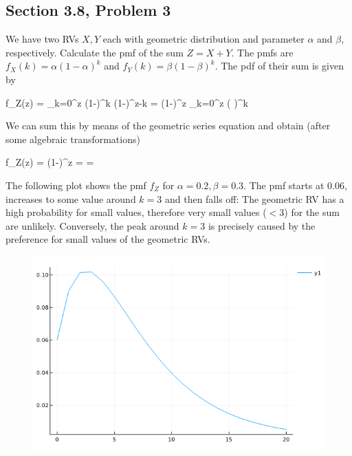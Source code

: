 
\subsection{Section 3.8, Problem 3}

We have two RVs $X, Y$ each with geometric distribution and parameter $\alpha$ and $\beta$, respectively. Calculate the pmf of the sum $Z = X+Y$. The pmfs are $f_X(k) = \alpha(1-\alpha)^k$ and $f_Y(k) = \beta(1-\beta)^k$. The pdf of their sum is given by

\bee
f_Z(z) = \sum_{k=0}^z \alpha (1-\alpha)^k \beta (1-\beta)^{z-k} = \alpha \beta (1-\beta)^z \sum_{k=0}^z \left( \right)^k
\eee

We can sum this by means of the geometric series equation and obtain (after some algebraic transformations)

\bee
f_Z(z) = \alpha \beta (1-\beta)^z  = \cdots = \frac{\alpha \beta}{\alpha-\beta} 
\eee

The following plot shows the pmf $f_Z$ for $\alpha=0.2, \beta=0.3$. The pmf starts at $0.06$, increases to some value around $k=3$ and then falls off: The geometric RV has a high probability for small values, therefore very small values ($< 3$) for the sum are unlikely. Conversely, the peak around $k=3$ is precisely caused by the preference for small values of the geometric RVs.


\begin{figure}[H]
  \includegraphics[scale=0.6]{images/1000_problems_in_prob_3_1.png}
\end{figure}


